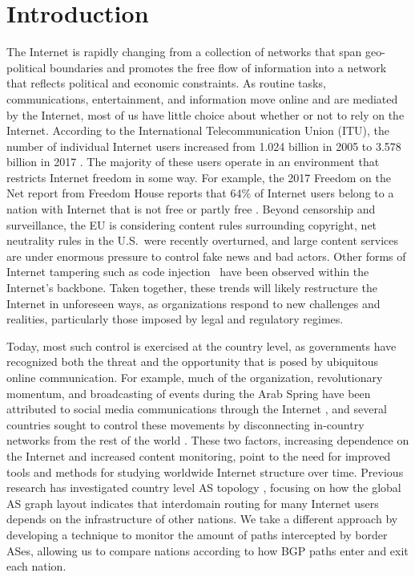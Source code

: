 \section{Introduction}

\par The Internet is rapidly changing from a collection of networks that span geo-political boundaries and promotes the free flow of information into a network that reflects political and economic constraints.
As routine
tasks, communications, entertainment, and information move online and
are mediated by the Internet, most of us have little choice about
whether or not to rely on the Internet.  According to the
International Telecommunication Union (ITU), the number of individual
Internet users increased from 1.024 billion in 2005 to 3.578 billion
in 2017 \cite{itu}. The majority of these users operate in an
environment that restricts Internet freedom in some way. For example,
the 2017 Freedom on the Net report from Freedom House reports that
64\% of Internet users belong to a nation with Internet that is not
free or partly free \cite{FOTN}.  Beyond censorship and surveillance,
the EU is considering content rules surrounding copyright, net
neutrality rules in the U.S.\ were recently overturned, and large
content services are under enormous pressure to control fake news and bad actors. Other forms of Internet
tampering such as code injection~\cite{badtraffic,191996} have been observed within the
Internet's backbone. Taken together, these
trends will likely restructure the Internet in unforeseen ways,
as organizations respond to new challenges and realities, particularly those imposed by legal and regulatory regimes.

Today, most such control is exercised at the country level, as
governments have recognized both the threat and the opportunity that
is posed by ubiquitous online communication. For example, much of the
organization, revolutionary momentum, and broadcasting of events
during the Arab Spring have been attributed to social media
communications through the Internet \cite{arabspring}, and several
countries sought to control these movements by disconnecting
in-country networks from the rest of the world \cite{BGPdisrupt}.
These two factors, increasing dependence on the Internet and increased
content monitoring, point to the need for improved tools and methods
for studying worldwide Internet structure over time. Previous research has
investigated country level AS topology \cite{DBLP:journals/corr/abs-0903-3218},
focusing on how the global AS graph layout indicates that interdomain routing
for many Internet users depends on the infrastructure of other nations. We take
a different approach by developing a technique to monitor the amount of paths intercepted
by border ASes, allowing us to compare nations according to how BGP paths enter and exit
each nation.

